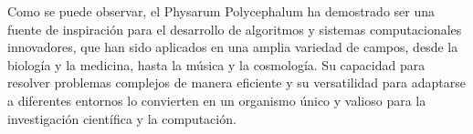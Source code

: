     \vskip 0.5cm
    Como se puede observar, el Physarum Polycephalum ha demostrado ser una fuente de inspiraci\'on para el desarrollo de algoritmos 
        y sistemas computacionales innovadores, que han sido aplicados en una amplia variedad de campos, desde la biolog\'ia y la medicina, 
        hasta la m\'usica y la cosmolog\'ia. Su capacidad para resolver problemas complejos de manera eficiente y su versatilidad para 
        adaptarse a diferentes entornos lo convierten en un organismo \'unico y valioso para la investigaci\'on cient\'ifica y la computaci\'on.
    